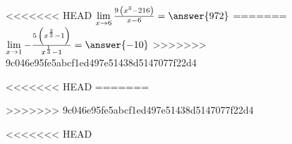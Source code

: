 {\begin{problem}
{\begin{problem}
{\begin{problem}
{\begin{problem}
{\begin{problem}
{\begin{problem}
{\begin{problem}
{\begin{problem}
{\begin{problem}
{\begin{problem}
{\begin{problem}
{\begin{problem}
{\begin{problem}
{\begin{problem}
{\begin{problem}
{\begin{problem}
{\begin{problem}
{\begin{problem}
{\begin{problem}
{\begin{problem}
{\begin{problem}
{\begin{problem}
{\begin{problem}
{\begin{problem}
{\begin{problem}
{\begin{problem}
{\begin{problem}
<<<<<<< HEAD
$\lim\limits_{x \rightarrow {6}} {\frac{9 \, {\left(x^{3} - 216\right)}}{x - 6}} = \answer{972}$
=======
$\lim\limits_{x \rightarrow {1}} {-\frac{5 \, {\left(x^{\frac{2}{3}} - 1\right)}}{x^{\frac{1}{3}} - 1}} = \answer{-10}$
>>>>>>> 9c046e95fe5abcf1ed497e51438d5147077f22d4
\end{problem}}



<<<<<<< HEAD
=======

>>>>>>> 9c046e95fe5abcf1ed497e51438d5147077f22d4






<<<<<<< HEAD
\end{problem}}
\end{problem}}
\end{problem}}
\end{problem}}
\end{problem}}
\end{problem}}
\end{problem}}
\end{problem}}
\end{problem}}
\end{problem}}
\end{problem}}
\end{problem}}
\end{problem}}
\end{problem}}
\end{problem}}
\end{problem}}
\end{problem}}
\end{problem}}
\end{problem}}
\end{problem}}
\end{problem}}
\end{problem}}
\end{problem}}
\end{problem}}
\end{problem}}
\end{problem}}
